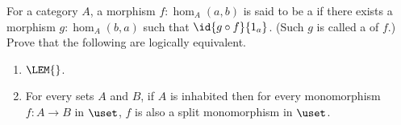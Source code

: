 \begin{ex}\label{ex:monos-are-split-monos-iff-LEM-holds}
  For a category $A$, a morphism $f: \hom_A(a,b)$ is said to be a  if there exists a morphism $g: \hom_A(b,a)$ such that $\id{g \circ f}{1_a}$. (Such $g$ is called a  of $f$.)
  Prove that the following are logically equivalent.
  \begin{enumerate}
  \item $\LEM{}$.
  \item For every sets $A$ and $B$, if $A$ is inhabited then for every monomorphism $f: A \to B$ in $\uset$, $f$ is also a split monomorphism in $\uset$.
  \end{enumerate}
\end{ex}

%


